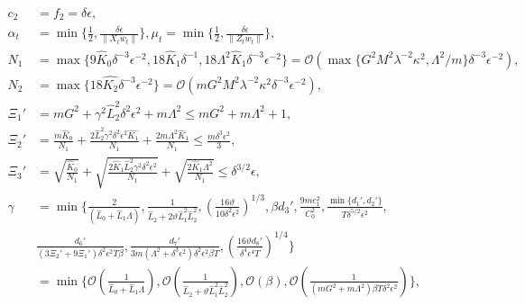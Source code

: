 \documentclass[twoside]{article} %
\theoremstyle{plain}
\theoremstyle{definition}
\theoremstyle{remark}
\newcommand{\brown}[1]{\textcolor{brown}{#1}}
\newcommand{\blue}[1]{\textcolor{blue}{#1}}
\newcommand{\hL}{\hat{L}}
\begin{document}
\begin{align}
        c_2&=f_2 = \delta\epsilon ,\nonumber\\
        \alpha_t &= \min\{\frac{1}{2},\frac{\delta\epsilon}{\|X_tw_t\|} \},\mu_t = \min\{\frac{1}{2},\frac{\delta\epsilon}{\| Z_tw_t\|} \},\nonumber\\
       N_1 & = \max\big\{9\hat{K}_0\delta^{-3}\epsilon^{-2}, 18\hat{K}_1\delta^{-1}, 18\Lambda^2\hat{K}_1\delta^{-3}\epsilon^{-2}\}= \mathcal{O}(\max\{G^2M^2\lambda^{-2}\kappa^2,{\Lambda^2}/{m}\}{\delta^{-3}}\epsilon^{-2}) ,\nonumber\\
        N_2& = \max\big\{ {18}\hat{K_2}\delta^{-3}\epsilon^{-2}\big\}=\mathcal{O}(mG^2M^2\lambda^{-2}\kappa^2\delta^{-3}\epsilon^{-2}),\nonumber\\
        \Xi_1' &= mG^2+\gamma^2\hL_2^2\delta^2\epsilon^2+m\Lambda^2\leq mG^2+m\Lambda^2+1,\nonumber\\
        \Xi_2' &= \frac{m\hat{K}_0}{N_1}+\frac{2\hL_2^2\gamma^2\delta^2\epsilon^2\hat{K_1}}{N_1}+\frac{2m\Lambda^2\hat{K}_1}{N_1}\leq\frac{m\delta^3\epsilon^2}{3}, \nonumber\\
        \Xi_3' &=\sqrt{\frac{\hat{K}_0}{N_1}}+\sqrt{\frac{2\hat{K}_1\hL_2^2\gamma^2\delta^2\epsilon^2}{N_1}}+\sqrt{\frac{2\hat{K}_1\Lambda^2}{N_1}}\leq \delta^{3/2}\epsilon,\nonumber
        \\
        \gamma &=\min\Big\{{\frac{2}{(\hL_0+\hL_1\Lambda)},\frac{1}{\hL_2+2\vartheta\hL_1^2\hL_2^2}, (\frac{16\vartheta}{10\delta^2\epsilon^2})^{1/3}},{\beta d_3'},{\frac{9me_1^2}{C_0^2}},\frac{\min\{d_1',d_2'\}}{T\delta^{5/2}\epsilon^2},\nonumber\\
        &\frac{d_6'}{(3\Xi_2'+9\Xi_1')\delta^2\epsilon^2T\beta}, \frac{d_7'}{3m(\Lambda^2+\delta^3\epsilon^2)\delta^2\epsilon^2\beta T},(\frac{16\vartheta d_8'}{\delta^4\epsilon^4T})^{1/4}
        \Big\}\nonumber\\
        &=\min\Big\{ \mathcal{O}(\frac{1}{\hL_0+\hL_1\Lambda}), \mathcal{O}(\frac{1}{\hL_2+\vartheta\hL_1^2\hL_2^2}),\mathcal{O}(\beta),\mathcal{O}(\frac{1}{(mG^2+m\Lambda^2)\beta T\delta^2\epsilon^2}) \Big\},\nonumber\\

\end{align}
\end{document}
